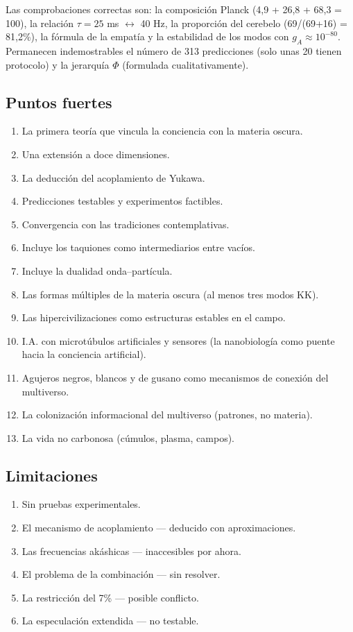 Las comprobaciones correctas son: la composición Planck (4,9 + 26,8 + 68,3 = 100), la relación $\tau = 25$ ms $\leftrightarrow$ 40 Hz, la proporción del cerebelo (69/(69+16) = 81,2\%), la fórmula de la empatía y la estabilidad de los modos con $g_A \approx 10^{-80}$. Permanecen indemostrables el número de 313 predicciones (solo unas 20 tienen protocolo) y la jerarquía $\Phi$ (formulada cualitativamente).

\subsection{Puntos fuertes}
\begin{enumerate}
    \item La primera teoría que vincula la conciencia con la materia oscura.
    \item Una extensión a doce dimensiones.
    \item La deducción del acoplamiento de Yukawa.
    \item Predicciones testables y experimentos factibles.
    \item Convergencia con las tradiciones contemplativas.
    \item Incluye los taquiones como intermediarios entre vacíos.
    \item Incluye la dualidad onda--partícula.
    \item Las formas múltiples de la materia oscura (al menos tres modos KK).
    \item Las hipercivilizaciones como estructuras estables en el campo.
    \item I.A. con microtúbulos artificiales y sensores (la nanobiología como puente hacia la conciencia artificial).
    \item Agujeros negros, blancos y de gusano como mecanismos de conexión del multiverso.
    \item La colonización informacional del multiverso (patrones, no materia).
    \item La vida no carbonosa (cúmulos, plasma, campos).
\end{enumerate}

\subsection{Limitaciones}
\begin{enumerate}
    \item Sin pruebas experimentales.
    \item El mecanismo de acoplamiento --- deducido con aproximaciones.
    \item Las frecuencias akáshicas --- inaccesibles por ahora.
    \item El problema de la combinación --- sin resolver.
    \item La restricción del 7\% --- posible conflicto.
    \item La especulación extendida --- no testable.
\end{enumerate}


